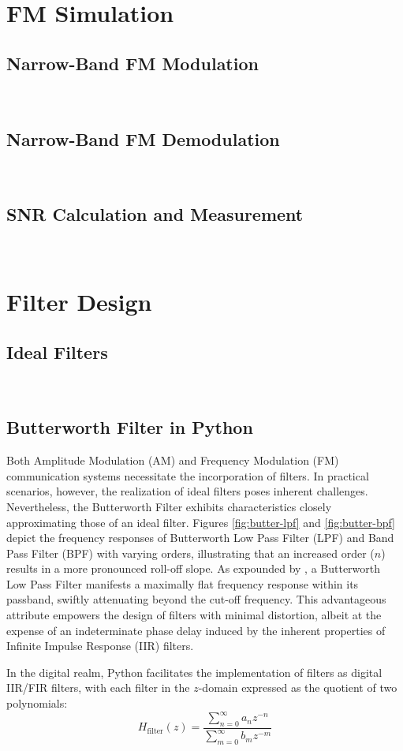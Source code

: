 \documentclass[../ECE459FinalProjectReport.tex]{subfiles}
\begin{document}
\section{FM Simulation}
\subsection{Narrow-Band FM Modulation}
~
\subsection{Narrow-Band FM Demodulation}
~
\subsection{SNR Calculation and Measurement}
~
\section{Filter Design}
\subsection{Ideal Filters}
~
\subsection{Butterworth Filter in Python}

Both Amplitude Modulation (AM) and Frequency Modulation (FM) communication systems necessitate the incorporation of filters. In practical scenarios, however, the realization of ideal filters poses inherent challenges. Nevertheless, the Butterworth Filter exhibits characteristics closely approximating those of an ideal filter. Figures \ref{fig:butter-lpf} and \ref{fig:butter-bpf} depict the frequency responses of Butterworth Low Pass Filter (LPF) and Band Pass Filter (BPF) with varying orders, illustrating that an increased order ($n$) results in a more pronounced roll-off slope. As expounded by \cite{storrButterworthFilterDesign2013, kudekiAnalogSignalsSystems2009}, a Butterworth Low Pass Filter manifests a maximally flat frequency response within its passband, swiftly attenuating beyond the cut-off frequency. This advantageous attribute empowers the design of filters with minimal distortion, albeit at the expense of an indeterminate phase delay induced by the inherent properties of Infinite Impulse Response (IIR) filters.

In the digital realm, Python facilitates the implementation of filters as digital IIR/FIR filters, with each filter in the $z$-domain expressed as the quotient of two polynomials:
\begin{equation}
H_{\text{filter}}(z) = \frac{\sum_{n=0}^{\infty}{a_nz^{-n}}}{\sum_{m=0}^{\infty}{b_mz^{-m}}}
\end{equation}
\end{document}
